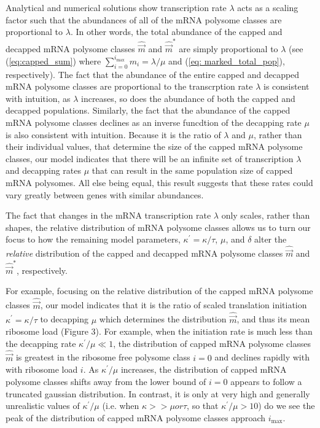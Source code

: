 \documentclass[a4,center,fleqn]{NAR}
\newcommand\mmpar[1]{\marginpar{\begin{spacing}{0.7}\raggedright \singlespacing \tiny \textbf{M:} #1 \end{spacing}}}  %
\newcommand{\imax}{\ensuremath{{i_{\max}}}\xspace}
\newcommand{\kappaprime}{\ensuremath{\kappa^{\prime}}\xspace}
\newcommand{\mvec}{\ensuremath{\vec{m}}\xspace}
\newcommand{\mvechat}{\ensuremath{\hat{\mvec}}\xspace}
\newcommand{\mvechatstar}{\ensuremath{\mvechat^*}\xspace}
\begin{document}
Analytical and numerical solutions show transcription rate $\lambda$ acts as a scaling factor such that the abundances
  of all of the mRNA polysome classes are proportional to $\lambda$.
  In other words, the total abundance of the capped and decapped mRNA polysome classes $\mvechat$ and $\mvechatstar$ are simply proportional to $\lambda$ (see (\ref{eq:capped_sum}) where $\sum_{i = 0} ^\imax m_i = \lambda/\mu$ and (\ref{eq: marked_total_pop}), respectively).
  The fact that the abundance of the entire capped and decapped mRNA polysome classes are proportional to the transcrption rate $\lambda$ is consistent with intuition, as $\lambda$ increases, so does the abundance of both the capped and decapped populations.
  Similarly, the fact that the abundance of the capped mRNA polysome classes declines as an inverse funcdtion of the decapping rate $\mu$ is also consistent with intuition.
  Because it is the ratio of $\lambda$ and $\mu$, rather than their individual values, that determine the size of the capped mRNA polysome classes, our model indicates that there will be an infinite set of transcription $\lambda$ and decapping rates $\mu$ that can result in the same population size of capped mRNA polysomes.
  All else being equal, this result suggests that these rates could vary greatly between genes with similar abundances.


The fact that changes in the mRNA transcription rate  $\lambda$ only scales, rather than shapes, the relative distribution of mRNA polysome classes allows us to turn our focus to how the remaining model parameters, $\kappaprime = \kappa/\tau$, $\mu$, and $\delta$ alter the \emph{relative} distribution of the capped and decapped mRNA polysome classes \mvechat and \mvechatstar, respectively.

For example, focusing on the relative distribution of the capped mRNA polysome classes $\mvechat$, our model indicates that it is the ratio of scaled translation initiation $\kappaprime = \kappa/\tau$ to decapping $\mu$ which determines the distribution \mvechat, and thus its mean ribosome load  (Figure 3).
    For example, when the initiation rate is much less than the decapping rate $\kappaprime/\mu \ll 1$, the distribution of capped mRNA polysome classes $\mvechat$ is greatest in the ribosome free polysome class $i=0$ and declines rapidly with with ribosome load $i$.
    As $\kappaprime/\mu$ increases, the distribution of capped mRNA polysome classes shifts away from the lower bound of $i = 0$ appears to follow a truncated gaussian distribution.
    In contrast, it is only at very high and generally unrealistic values of $\kappaprime/\mu$ (i.e.  when $\kappa>>\mu or \tau$, so that $\kappaprime/\mu > 10$) do we see the peak of the distribution of capped mRNA polysome classes approach $\imax$.
\end{document}
